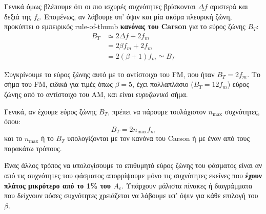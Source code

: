 \documentclass[11pt,a4paper,notitlepage,fleqn]{article}
\begin{document}

Γενικά όμως βλέπουμε ότι οι πιο ισχυρές συχνότητες βρίσκονται \( \underline{Δf} \) αριστερά
και δεξιά της \( f_c \). Επομένως, αν λάβουμε υπ' όψιν και μία ακόμα πλευρική ζώνη,
προκύπτει ο εμπειρικός
rule-of-thumb \textbf{κανόνας του Carson} για το εύρος ζώνης \( B_{T} \):
\begin{align*}
	B_T &\simeq 2Δf + 2f_m
	\\ &=2βf_m + 2f_m
	\\ &= \boxed{2(β+1)f_m \simeq B_T}
\end{align*}

Συγκρίνουμε το εύρος ζώνης αυτό με το αντίστοιχο του FM, που ήταν \( B_T=2f_m \). Το σήμα
του FM, ειδικά για τιμές όπως \( β = 5 \), έχει πολλαπλάσιο (\( B_T = 12f_m \)) εύρος ζώνης
από το αντίστοιχο του AM, και είναι \textit{ευρυζωνικό} σήμα.

Γενικά, αν έχουμε εύρος ζώνης \( B_T \), πρέπει να πάρουμε τουλάχιστον \( n_{\max} \)
συχνότητες, όπου:
\[
B_T = 2n_{\max}f_m
\]
και το \( n_{\max} \) ή το \( B_T \) υπολογίζονται με τον κανόνα του Carson ή με έναν
από τους παρακάτω τρόπους.

Ένας άλλος τρόπος να υπολογίσουμε το επιθυμητό εύρος ζώνης του φάσματος είναι αν από τις
συχνότητες του φάσματος απορρίψουμε μόνο τις συχνότητες εκείνες που \textbf{έχουν πλάτος 
μικρότερο από το 1\% του \( A_c \)}. Υπάρχουν
μάλιστα πίνακες ή διαγράμματα που δείχνουν πόσες συχνότητες χρειάζεται να λάβουμε υπ' όψιν 
για κάθε επιλογή του \( β \).
\end{document}

